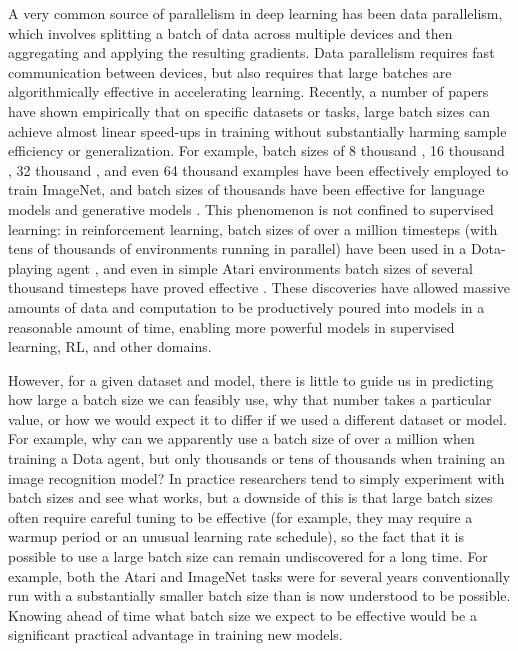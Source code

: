 \documentclass[english]{article}
\begin{document}
A very common source of parallelism in deep learning has been data parallelism, which involves splitting a batch of data across multiple devices and then aggregating and applying the resulting gradients. Data parallelism requires fast communication between devices, but also requires that large batches are algorithmically effective in accelerating learning. Recently, a number of papers have shown empirically that on specific datasets or tasks, large batch sizes can achieve almost linear speed-ups in training without substantially harming sample efficiency or generalization. For example, batch sizes of 8 thousand \cite{1706.02677}, 16 thousand \cite{1711.00489}, 32 thousand \cite{1708.03888,1709.05011, 1711.04325}, and even 64 thousand \cite{1807.11205} examples have been effectively employed to train ImageNet, and batch sizes of thousands have been effective for language models and generative models \cite{1806.00187,1808.01371,1809.11096}. This phenomenon is not confined to supervised learning: in reinforcement learning, batch sizes of over a million timesteps (with tens of thousands of environments running in parallel) have been used in a Dota-playing agent \cite{OpenAI_Five}, and even in simple Atari environments batch sizes of several thousand timesteps have proved effective \cite{1801.02852,1803.00933,1803.02811}. These discoveries have allowed massive amounts of data and computation to be productively poured into models in a reasonable amount of time, enabling more powerful models in supervised learning, RL, and other domains.

However, for a given dataset and model, there is little to guide us in predicting how large a batch size we can feasibly use, why that number takes a particular value, or how we would expect it to differ if we used a different dataset or model. For example, why can we apparently use a batch size of over a million when training a Dota agent, but only thousands or tens of thousands when training an image recognition model? In practice researchers tend to simply experiment with batch sizes and see what works, but a downside of this is that large batch sizes often require careful tuning to be effective (for example, they may require a warmup period or an unusual learning rate schedule), so the fact that it is possible to use a large batch size can remain undiscovered for a long time. For example, both the Atari and ImageNet tasks were for several years conventionally run with a substantially smaller batch size than is now understood to be possible. Knowing ahead of time what batch size we expect to be effective would be a significant practical advantage in training new models.
\end{document}
